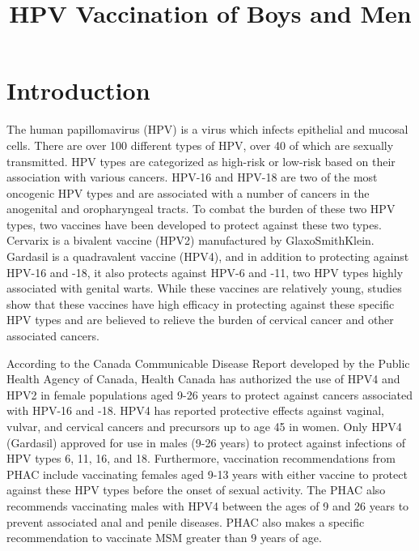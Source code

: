 \documentclass[12pt]{article}
\title{HPV Vaccination of Boys and Men}
\begin{document}
\maketitle

\section{Introduction}

The human papillomavirus (HPV) is a virus which infects epithelial and mucosal cells.  There are over 100 different types of HPV, over 40 of which are sexually transmitted.  HPV types are categorized as high-risk or low-risk based on their association with various cancers.  HPV-16 and HPV-18 are two of the most oncogenic HPV types and are associated with a number of cancers in the anogenital and oropharyngeal tracts.  To combat the burden of these two HPV types, two vaccines have been developed to protect against these two types.  Cervarix is a bivalent vaccine (HPV2) manufactured by GlaxoSmithKlein.  Gardasil is a quadravalent vaccine (HPV4), and in addition to protecting against HPV-16 and -18, it also protects against HPV-6 and -11, two HPV types highly associated with genital warts.  While these vaccines are relatively young, studies show that these vaccines have high efficacy in protecting against these specific HPV types and are believed to relieve the burden of cervical cancer and other associated cancers.  

According to the Canada Communicable Disease Report developed by the Public Health Agency of Canada, Health Canada has authorized the use of HPV4 and HPV2 in female populations aged 9-26 years to protect against cancers associated with HPV-16 and -18.  HPV4 has reported protective effects against vaginal, vulvar, and cervical cancers and precursors up to age 45 in women.  Only HPV4 (Gardasil) approved for use in males (9-26 years) to protect against infections of HPV types 6, 11, 16, and 18.  Furthermore, vaccination recommendations from PHAC include vaccinating females aged 9-13 years  with either vaccine to protect against these HPV types before the onset of sexual activity.  The PHAC also recommends vaccinating males with HPV4 between the ages of 9 and 26 years to prevent associated anal and penile diseases.  PHAC also makes a specific recommendation to vaccinate MSM greater than 9 years of age.  
\end{document}
